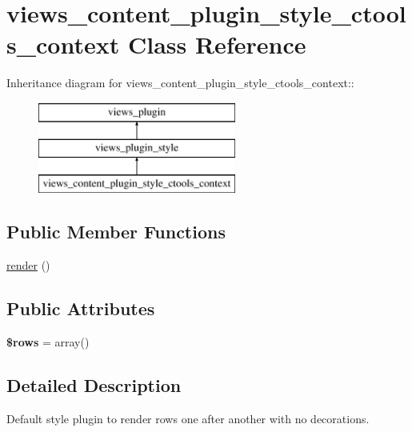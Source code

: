 \hypertarget{classviews__content__plugin__style__ctools__context}{
\section{views\_\-content\_\-plugin\_\-style\_\-ctools\_\-context Class Reference}
\label{classviews__content__plugin__style__ctools__context}
}
Inheritance diagram for views\_\-content\_\-plugin\_\-style\_\-ctools\_\-context::\begin{figure}[H]
\begin{center}
\leavevmode
\includegraphics[height=3cm]{classviews__content__plugin__style__ctools__context}
\end{center}
\end{figure}
\subsection*{Public Member Functions}
\begin{DoxyCompactItemize}
\item 
\hyperlink{classviews__content__plugin__style__ctools__context_a7b49db120c1bfa8e951e70bb24da42f1}{render} ()
\end{DoxyCompactItemize}
\subsection*{Public Attributes}
\begin{DoxyCompactItemize}
\item 
\hypertarget{classviews__content__plugin__style__ctools__context_a880be14f4b5e9d30834c20408695d6e7}{
{\bfseries \$rows} = array()}
\label{classviews__content__plugin__style__ctools__context_a880be14f4b5e9d30834c20408695d6e7}

\end{DoxyCompactItemize}


\subsection{Detailed Description}
Default style plugin to render rows one after another with no decorations. 

